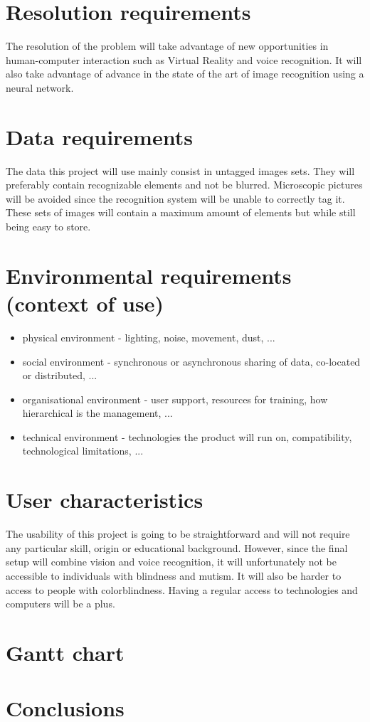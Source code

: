 \documentclass[11pt,a4paper]{article}
\begin{document}
\section{Resolution requirements}

The resolution of the problem will take advantage of new opportunities in human-computer interaction such as Virtual Reality and voice recognition. It will also take advantage of advance in the state of the art of image recognition using a neural network.

\section{Data requirements}

The data this project will use mainly consist in untagged images sets. They will preferably contain recognizable elements and not be blurred. Microscopic pictures will be avoided since the recognition system will be unable to correctly tag it. These sets of images will contain a maximum amount of elements but while still being easy to store. 


\section{Environmental requirements (context of use)\todo{}}

\begin{itemize}
\item physical environment
- lighting, noise, movement, dust, ...
\item social environment
- synchronous or asynchronous sharing of data, co-located or distributed, ...
\item organisational environment
- user support, resources for training, how hierarchical is the management, ...
\item technical environment
- technologies the product will run on, compatibility, technological limitations, ...
\end{itemize}

\section{User characteristics}

The usability of this project is going to be straightforward and will not require any particular skill, origin or educational background. However, since the final setup will combine vision and voice recognition, it will unfortunately not be accessible to individuals with blindness and mutism. It will also be harder to access to people with colorblindness. Having a regular access to technologies and computers will be a plus.




\section{Gantt chart}

\section{Conclusions}
\end{document}
